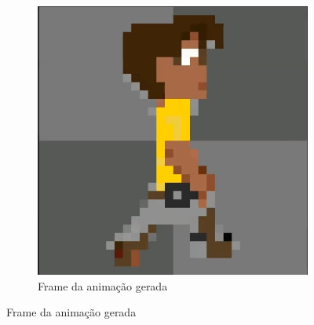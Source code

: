 \begin{figure}[htbp]
\begin{subfigure}{0.35\linewidth}
        \includegraphics[width=1\linewidth]{figs/pixelLab/dia4/print5.PNG}
        \caption{\small Frame da animação gerada}
        \label{fig:pixelLabAnimacao10b}
    \end{subfigure}
\end{figure}

